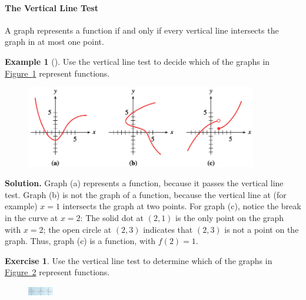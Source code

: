 \documentclass[10pt,]{book}
\theoremstyle{plain}
\theoremstyle{definition}
\newtheorem{exercise}[theorem]{Exercise}
\theoremstyle{definition}
\newtheorem{example}[theorem]{Example}
\numberwithin{equation}{section}
\begin{document}
\paragraph[The Vertical Line Test]{The Vertical Line Test}\label{paragraphs-9}
A graph represents a function if and only if every vertical line intersects the graph in
at most one point.%
\begin{example}[]\label{example-vertical-line-test}
Use the vertical line test to decide which of the graphs in \hyperref[fig-vertical-line-test2]{Figure~\ref{fig-vertical-line-test2}}  represent functions.%
\leavevmode%
\begin{figure}
\centering
\includegraphics[width=0.90\textwidth,]{images/fig-vertical-line-test2.svg}\caption{\label{fig-vertical-line-test2}}
\end{figure}
\par\medskip\noindent%
\textbf{Solution.}\quad 
    Graph (a) represents a function, because it passes the vertical line test. Graph (b) is not the graph of a function, because the vertical line at (for example) \(x = 1\) intersects the graph at two points. For graph (c), notice the break in the curve at \(x = 2\): The solid dot at \((2, 1)\) is the only point on the graph with \(x = 2\); the open circle at \((2, 3)\) indicates that \((2, 3)\) is not a point on the graph. Thus, graph (c) is a function, with \(f(2) = 1\).
\end{example}
\begin{exercise}\label{example-vertical-line-test3}
Use the vertical line test to determine which of the graphs in \hyperref[fig-vertical-line-test3]{Figure~\ref{fig-vertical-line-test3}} represent functions.
    \leavevmode%
\begin{figure}
\centering
\includegraphics[width=0.100\textwidth,]{images/fig-vertical-line-test3.svg}\caption{\label{fig-vertical-line-test3}}
\end{figure}
\end{exercise}
\typeout{************************************************}
\typeout{************************************************}
\end{document}
